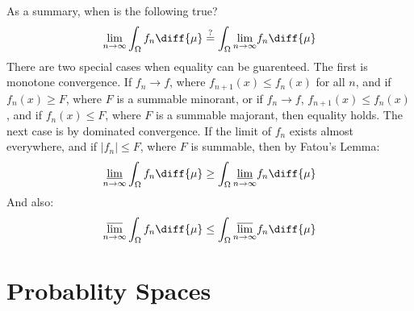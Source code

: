 \documentclass[crop=false,class=book,oneside]{standalone}
\begin{document}
        As a summary, when is the following true?
        \begin{equation}
            \underset{n\rightarrow\infty}{\lim}
            \int_{\Omega}f_{n}\diff{\mu}
            \overset{?}{=}\int_{\Omega}
            \underset{n\rightarrow\infty}{\lim}f_{n}\diff{\mu}
        \end{equation}
        There are two special cases when equality can be guarenteed.
        The first is monotone convergence. If
        $f_{n}\rightarrow{f}$, where $f_{n+1}(x)\leq{f}_{n}(x)$ for
        all $n$, and if $f_{n}(x)\geq{F}$, where $F$ is a
        summable minorant, or if $f_{n}\rightarrow{f}$,
        $f_{n+1}(x)\leq{f}_{n}(x)$, and if
        $f_{n}(x)\leq{F}$, where $F$ is a summable majorant, then
        equality holds. The next case is by dominated convergence.
        If the limit of $f_{n}$ exists almost everywhere, and if
        $|f_{n}|\leq{F}$, where $F$ is summable, then by Fatou's
        Lemma:
        \begin{equation}
            \underset{n\rightarrow\infty}{\underline{\lim}}
            \int_{\Omega}f_{n}\diff{\mu}
            \geq\int_{\Omega}
            \underset{n\rightarrow\infty}{\underline{\lim}}
            f_{n}\diff{\mu}
        \end{equation}
        And also:
        \begin{equation}
            \underset{n\rightarrow\infty}{\overline{\lim}}
            \int_{\Omega}f_{n}\diff{\mu}
            \leq\int_{\Omega}
            \underset{n\rightarrow\infty}{\overline{\lim}}
            f_{n}\diff{\mu}
        \end{equation}
    \section{Probablity Spaces}
\end{document}
